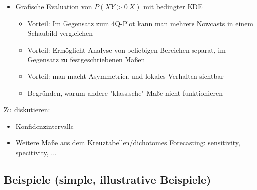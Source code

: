 \begin{itemize}
    \item Grafische Evaluation von $P(XY > 0 | X)$ mit bedingter KDE
    \begin{itemize}
        \item Vorteil: Im Gegensatz zum 4Q-Plot kann man mehrere Nowcasts in einem Schaubild vergleichen
        \item Vorteil: Ermöglicht Analyse von beliebigen Bereichen separat, im Gegensatz zu festgeschriebenen Maßen
        \item Vorteil: man macht Asymmetrien und lokales Verhalten sichtbar 
        \item Begründen, warum andere "klassische" Maße nicht funktionieren
    \end{itemize}
\end{itemize}


Zu diskutieren:
\begin{itemize}
    \item Konfidenzintervalle
    \item Weitere Maße aus dem Kreuztabellen/dichotomes Forecasting: sensitivity, specitivity, ...
\end{itemize}

\subsection{Beispiele (simple, illustrative Beispiele)}